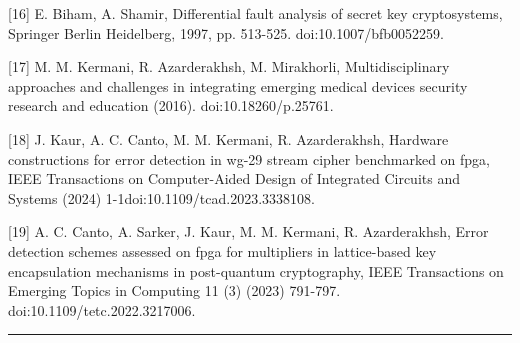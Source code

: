 [16] E. Biham, A. Shamir, Differential fault analysis of secret key cryptosystems, Springer Berlin Heidelberg, 1997, pp. 513-525. doi:10.1007/bfb0052259.


[17] M. M. Kermani, R. Azarderakhsh, M. Mirakhorli, Multidisciplinary approaches and challenges in integrating emerging medical devices security research and education (2016). \linebreak doi:10.18260/p.25761.


[18] J. Kaur, A. C. Canto, M. M. Kermani, R. Azarderakhsh, Hardware constructions for error detection in wg-29 stream cipher benchmarked on fpga, IEEE Transactions on Computer-Aided Design of Integrated Circuits and Systems (2024) 1-1doi:10.1109/tcad.2023.3338108.

[19] A. C. Canto, A. Sarker, J. Kaur, M. M. Kermani, R. Azarderakhsh, Error detection schemes assessed on fpga for multipliers in lattice-based key encapsulation mechanisms in post-quantum cryptography, IEEE Transactions on Emerging Topics in Computing 11 (3) (2023) 791-797. doi:10.1109/tetc.2022.3217006.


\color{black}


\noindent\rule{\linewidth}{6.0pt}